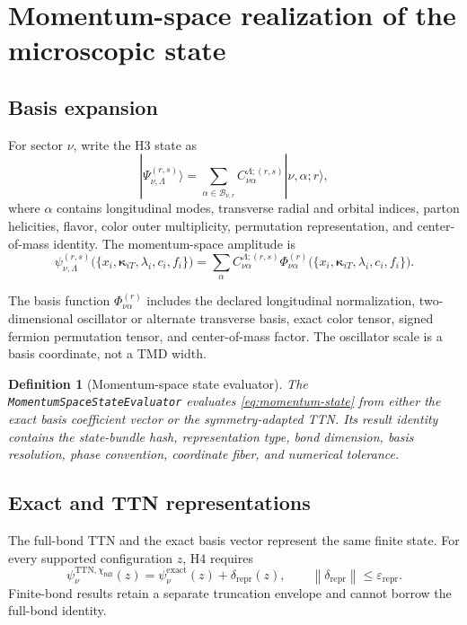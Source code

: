 \documentclass[11pt]{article}
\newtheorem{definition}{Definition}[section]
\newcommand{\cB}{\mathcal B}
\newcommand{\eps}{\varepsilon}
\newcommand{\norm}[1]{\left\lVert#1\right\rVert}
\newcommand{\StateEvaluator}{\texttt{MomentumSpaceStateEvaluator}}
\begin{document}
\section{Momentum-space realization of the microscopic state}
\label{sec:state-evaluator}

\subsection{Basis expansion}

For sector \(\nu\), write the H3 state as
\begin{equation}
 |\Psi_{\nu,\Lambda}^{(r,s)}\rangle
 =
 \sum_{\alpha\in\cB_{\nu,r}}
 C_{\nu\alpha}^{\Lambda;(r,s)}
 |\nu,\alpha;r\rangle,
 \label{eq:basis-state}
\end{equation}
where \(\alpha\) contains longitudinal modes, transverse radial and orbital
indices, parton helicities, flavor, color outer multiplicity, permutation
representation, and center-of-mass identity.  The momentum-space amplitude is
\begin{equation}
 \psi_{\nu,\Lambda}^{(r,s)}
 \bigl(\{x_i,\bm\kappa_{iT},\lambda_i,c_i,f_i\}\bigr)
 =
 \sum_{\alpha}
 C_{\nu\alpha}^{\Lambda;(r,s)}
 \Phi_{\nu\alpha}^{(r)}
 \bigl(\{x_i,\bm\kappa_{iT},\lambda_i,c_i,f_i\}\bigr).
 \label{eq:momentum-state}
\end{equation}

The basis function \(\Phi_{\nu\alpha}^{(r)}\) includes the declared
longitudinal normalization, two-dimensional oscillator or alternate
transverse basis, exact color tensor, signed fermion permutation tensor, and
center-of-mass factor.  The oscillator scale is a basis coordinate, not a
TMD width.

\begin{definition}[Momentum-space state evaluator]
The \StateEvaluator{} evaluates \cref{eq:momentum-state} from either the exact
basis coefficient vector or the symmetry-adapted TTN.  Its result identity
contains the state-bundle hash, representation type, bond dimension, basis
resolution, phase convention, coordinate fiber, and numerical tolerance.
\end{definition}

\subsection{Exact and TTN representations}

The full-bond TTN and the exact basis vector represent the same finite state.
For every supported configuration \(z\), H4 requires
\begin{equation}
 \psi_{\nu}^{\mathrm{TTN},\chi_{\mathrm{full}}}(z)
 =
 \psi_{\nu}^{\mathrm{exact}}(z)
 +\delta_{\mathrm{repr}}(z),
 \qquad
 \norm{\delta_{\mathrm{repr}}}\leq\eps_{\mathrm{repr}}.
 \label{eq:exact-ttn-amplitude}
\end{equation}
Finite-bond results retain a separate truncation envelope and cannot borrow
the full-bond identity.
\end{document}
